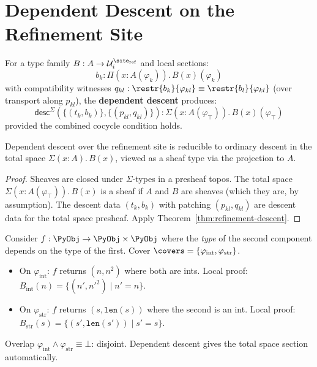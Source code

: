 \section{Dependent Descent on the Refinement Site}
\label{sec:dependent-descent}

\begin{definition}
\label{def:dependent-descent}
For a type family $B : A \to \mathcal{U}_i^{\site_{\mathrm{ref}}}$ and
local sections:
\[
  b_k : \Pi(x : A(\varphi_k)).\, B(x)(\varphi_k)
\]
with compatibility witnesses
$q_{kl} : \restr{b_k}{\varphi_{kl}} \equiv \restr{b_l}{\varphi_{kl}}$
(over transport along $p_{kl}$), the \textbf{dependent descent} produces:
\[
  \mathsf{desc}^\Sigma(\{(t_k, b_k)\}, \{(p_{kl}, q_{kl})\}) :
  \Sigma(x : A(\varphi_\top)).\, B(x)(\varphi_\top)
\]
provided the combined cocycle condition holds.
\end{definition}

\begin{proposition}
Dependent descent over the refinement site is reducible to ordinary descent
in the total space $\Sigma(x : A).\, B(x)$, viewed as a sheaf type via the
projection to $A$.
\end{proposition}

\begin{proof}
Sheaves are closed under $\Sigma$-types in a presheaf topos.  The total
space $\Sigma(x : A(\varphi_\top)).\, B(x)$ is a sheaf if $A$ and $B$ are
sheaves (which they are, by assumption).  The descent data
$(t_k, b_k)$ with patching $(p_{kl}, q_{kl})$ are descent data for the
total space presheaf.  Apply Theorem~\ref{thm:refinement-descent}.
\end{proof}

\begin{example}
\label{ex:dependent-descent}
Consider $f : \PyObj \to \PyObj \times \PyObj$ where the \emph{type} of
the second component depends on the type of the first.  Cover
$\covers = \{\varphi_{\mathrm{int}}, \varphi_{\mathrm{str}}\}$.
\begin{itemize}
\item On $\varphi_{\mathrm{int}}$: $f$ returns $(n, n^2)$ where both are ints.
  Local proof: $B_{\mathrm{int}}(n) = \{(n', n'^2) \mid n' = n\}$.
\item On $\varphi_{\mathrm{str}}$: $f$ returns $(s, \mathtt{len}(s))$ where
  the second is an int.
  Local proof: $B_{\mathrm{str}}(s) = \{(s', \mathtt{len}(s')) \mid s' = s\}$.
\end{itemize}
Overlap $\varphi_{\mathrm{int}} \wedge \varphi_{\mathrm{str}} \equiv \bot$:
disjoint.  Dependent descent gives the total space section automatically.
\end{example}


